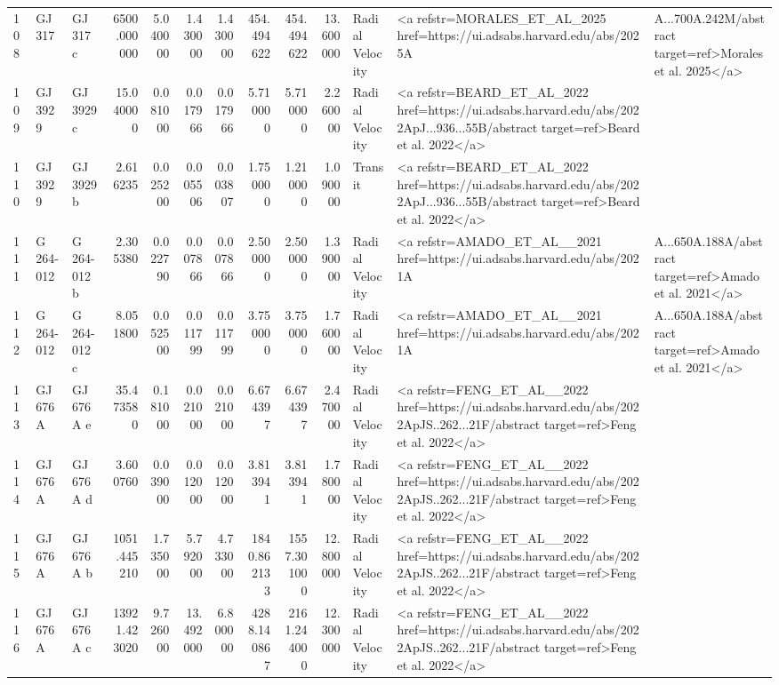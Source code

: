 \begin{tabular}{lllrrrrrrrll}
108 & GJ 317 & GJ 317 c & 6500.000000 & 5.040000 & 1.430000 & 1.430000 & 454.494622 & 454.494622 & 13.600000 & Radial Velocity & <a refstr=MORALES_ET_AL_2025 href=https://ui.adsabs.harvard.edu/abs/2025A&A...700A.242M/abstract target=ref>Morales et al. 2025</a> \\
109 & GJ 3929 & GJ 3929 c & 15.040000 & 0.081000 & 0.017966 & 0.017966 & 5.710000 & 5.710000 & 2.260000 & Radial Velocity & <a refstr=BEARD_ET_AL_2022 href=https://ui.adsabs.harvard.edu/abs/2022ApJ...936...55B/abstract target=ref>Beard et al. 2022</a> \\
110 & GJ 3929 & GJ 3929 b & 2.616235 & 0.025200 & 0.005506 & 0.003807 & 1.750000 & 1.210000 & 1.090000 & Transit & <a refstr=BEARD_ET_AL_2022 href=https://ui.adsabs.harvard.edu/abs/2022ApJ...936...55B/abstract target=ref>Beard et al. 2022</a> \\
111 & G 264-012 & G 264-012 b & 2.305380 & 0.022790 & 0.007866 & 0.007866 & 2.500000 & 2.500000 & 1.390000 & Radial Velocity & <a refstr=AMADO_ET_AL__2021 href=https://ui.adsabs.harvard.edu/abs/2021A&A...650A.188A/abstract target=ref>Amado et al. 2021</a> \\
112 & G 264-012 & G 264-012 c & 8.051800 & 0.052500 & 0.011799 & 0.011799 & 3.750000 & 3.750000 & 1.760000 & Radial Velocity & <a refstr=AMADO_ET_AL__2021 href=https://ui.adsabs.harvard.edu/abs/2021A&A...650A.188A/abstract target=ref>Amado et al. 2021</a> \\
113 & GJ 676 A & GJ 676 A e & 35.473580 & 0.181000 & 0.021000 & 0.021000 & 6.674397 & 6.674397 & 2.470000 & Radial Velocity & <a refstr=FENG_ET_AL__2022 href=https://ui.adsabs.harvard.edu/abs/2022ApJS..262...21F/abstract target=ref>Feng et al. 2022</a> \\
114 & GJ 676 A & GJ 676 A d & 3.600760 & 0.039000 & 0.012000 & 0.012000 & 3.813941 & 3.813941 & 1.780000 & Radial Velocity & <a refstr=FENG_ET_AL__2022 href=https://ui.adsabs.harvard.edu/abs/2022ApJS..262...21F/abstract target=ref>Feng et al. 2022</a> \\
115 & GJ 676 A & GJ 676 A b & 1051.445210 & 1.735000 & 5.792000 & 4.733000 & 1840.862133 & 1557.301000 & 12.800000 & Radial Velocity & <a refstr=FENG_ET_AL__2022 href=https://ui.adsabs.harvard.edu/abs/2022ApJS..262...21F/abstract target=ref>Feng et al. 2022</a> \\
116 & GJ 676 A & GJ 676 A c & 13921.423020 & 9.726000 & 13.492000 & 6.800000 & 4288.140867 & 2161.244000 & 12.300000 & Radial Velocity & <a refstr=FENG_ET_AL__2022 href=https://ui.adsabs.harvard.edu/abs/2022ApJS..262...21F/abstract target=ref>Feng et al. 2022</a> \\

\end{tabular}
